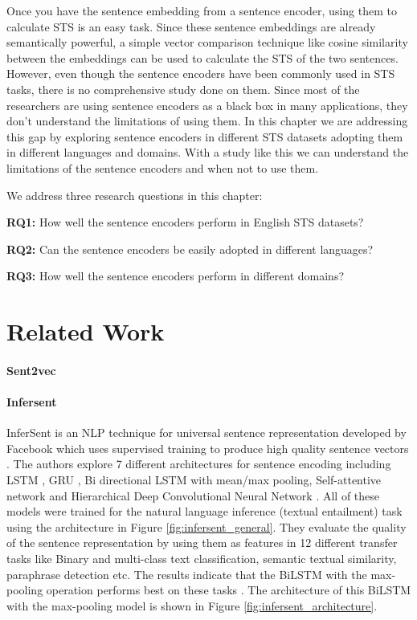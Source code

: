 Once you have the sentence embedding from a sentence encoder, using them to calculate STS is an easy task. Since these sentence embeddings are already semantically powerful, a simple vector comparison technique like cosine similarity between the embeddings can be used to calculate the STS of the two sentences. However, even though the sentence encoders have been commonly used in STS tasks, there is no comprehensive study done on them. Since most of the researchers are using sentence encoders as a black box in many applications, they don't understand the limitations of using them. In this chapter we are addressing this gap by exploring sentence encoders in different STS datasets adopting them in different languages and domains. With a study like this we can understand the limitations of the sentence encoders and when not to use them. 

We address three research questions in this chapter:

\textbf{RQ1:} How well the sentence encoders perform in English STS datasets?

\textbf{RQ2:} Can the sentence encoders be easily adopted in different languages?

\textbf{RQ3:} How well the sentence encoders perform in different domains?

\section{Related Work}
\label{sec:sentence_related}

\paragraph{Sent2vec}
\cite{pagliardini-etal-2018-unsupervised}


\cite{lau-baldwin-2016-empirical}
\paragraph{Infersent}
InferSent is an NLP technique for universal sentence representation developed by Facebook which uses supervised training to produce high quality sentence vectors \cite{conneau-EtAl:2017:EMNLP2017}. The authors explore 7 different architectures for sentence
encoding including LSTM \cite{10.1162/neco.1997.9.8.1735}, GRU \cite{Chung2014EmpiricalEO}, Bi directional LSTM \cite{650093} with mean/max pooling, Self-attentive network and Hierarchical Deep Convolutional Neural Network \cite{conneau-EtAl:2017:EMNLP2017}. All of these models were trained for the natural language inference (textual entailment) task using the architecture in Figure \ref{fig:infersent_general}. They evaluate the quality of the sentence representation by using them as features in 12 different transfer tasks like Binary and multi-class text classification, semantic textual similarity, paraphrase detection etc. The results indicate that the BiLSTM with the max-pooling operation performs best on these tasks  \cite{conneau-EtAl:2017:EMNLP2017}. The architecture of this BiLSTM with the max-pooling model is shown in Figure \ref{fig:infersent_architecture}.

